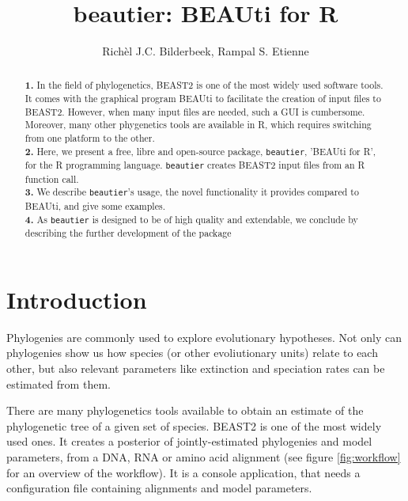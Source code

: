 \documentclass{article}
\title{beautier: BEAUti for R}
\author{Rich\`el J.C. Bilderbeek, Rampal S. Etienne}
\begin{document}
\maketitle


\begin{abstract}

  \textbf{1. }
    In the field of phylogenetics, 
     BEAST2 is one of the most widely used software tools. 
     It comes with the graphical program BEAUti to 
     facilitate the creation of input files to BEAST2. 
     However, when many input files are needed, 
     such a GUI is cumbersome. 
     Moreover, many other phygenetics tools are available 
     in R, which requires switching from one platform 
     to the other. \\
  \textbf{2. }
    Here, we present a free, libre and open-source package, \verb;beautier;, 
    'BEAUti for R', for the R programming language. 
    \verb;beautier; creates BEAST2 input files 
    from an R function call. \\
  \textbf{3. }
    We describe \verb;beautier;'s usage, the novel functionality it provides
    compared to BEAUti, and give some examples. \\
  \textbf{4. }
    As \verb;beautier; is designed to be of high quality and extendable, 
    we conclude by describing the further development of the package \\
\end{abstract}


\section{Introduction}

Phylogenies are commonly used to explore evolutionary hypotheses.
Not only can phylogenies show us how species (or other
evoliutionary units) relate to each other, 
but also relevant parameters like extinction and 
speciation rates can be estimated from them.


There are many phylogenetics tools available to obtain an estimate 
of the phylogenetic tree of a given set of species. 
BEAST2 \cite{bouckaert2014beast} is one of the most widely used ones. 
It creates a posterior of jointly-estimated phylogenies and model parameters, 
from a DNA, RNA or amino acid alignment (see figure \ref{fig:workflow} 
for an overview of the workflow). 
It is a console application, that needs a configuration file containing alignments and model parameters.
\end{document}
